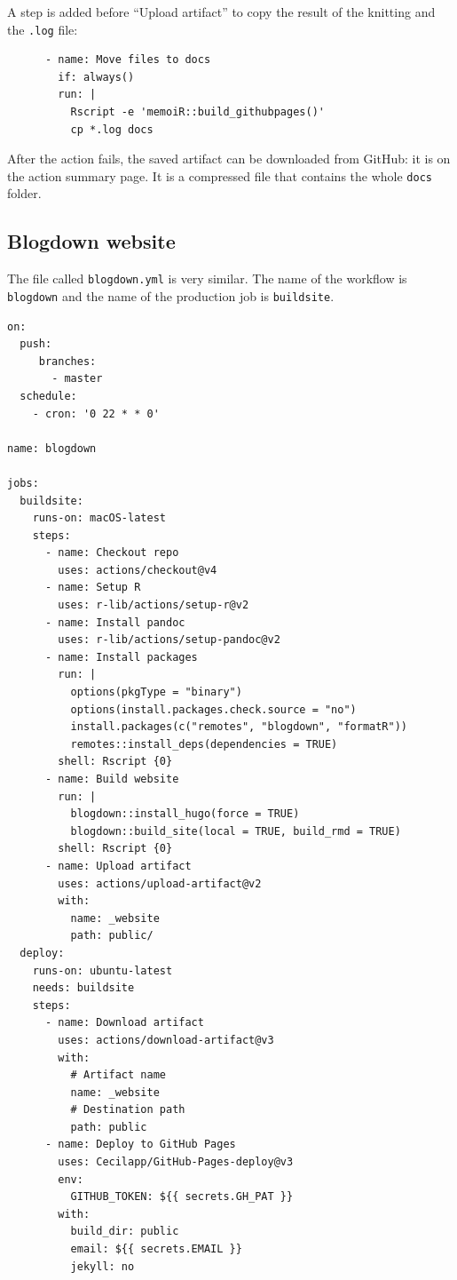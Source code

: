\documentclass[
  12pt,
  american,
  a4paper,
  extrafontsizes,onecolumn,openright
  ]{memoir}
\begin{document}
A step is added before \enquote{Upload artifact} to copy the result of the knitting and the \texttt{.log} file:

\begin{verbatim}
      - name: Move files to docs
        if: always()
        run: |
          Rscript -e 'memoiR::build_githubpages()'
          cp *.log docs
\end{verbatim}

After the action fails, the saved artifact can be downloaded from GitHub: it is on the action summary page.
It is a compressed file that contains the whole \texttt{docs} folder.

\subsection{Blogdown website}\label{sec:blogdown-ci}

The file called \texttt{blogdown.yml} is very similar.
The name of the workflow is \texttt{blogdown} and the name of the production job is \texttt{buildsite}.

\begin{verbatim}
on:
  push:
     branches:
       - master
  schedule:
    - cron: '0 22 * * 0'

name: blogdown

jobs:
  buildsite:
    runs-on: macOS-latest
    steps:
      - name: Checkout repo
        uses: actions/checkout@v4
      - name: Setup R
        uses: r-lib/actions/setup-r@v2
      - name: Install pandoc
        uses: r-lib/actions/setup-pandoc@v2
      - name: Install packages
        run: |
          options(pkgType = "binary")
          options(install.packages.check.source = "no")
          install.packages(c("remotes", "blogdown", "formatR"))
          remotes::install_deps(dependencies = TRUE)
        shell: Rscript {0}
      - name: Build website
        run: |
          blogdown::install_hugo(force = TRUE)
          blogdown::build_site(local = TRUE, build_rmd = TRUE)
        shell: Rscript {0}
      - name: Upload artifact
        uses: actions/upload-artifact@v2
        with:
          name: _website
          path: public/
  deploy:
    runs-on: ubuntu-latest
    needs: buildsite
    steps:
      - name: Download artifact
        uses: actions/download-artifact@v3
        with:
          # Artifact name
          name: _website
          # Destination path
          path: public
      - name: Deploy to GitHub Pages
        uses: Cecilapp/GitHub-Pages-deploy@v3
        env:
          GITHUB_TOKEN: ${{ secrets.GH_PAT }}
        with:
          build_dir: public
          email: ${{ secrets.EMAIL }}
          jekyll: no
\end{verbatim}
\end{document}
